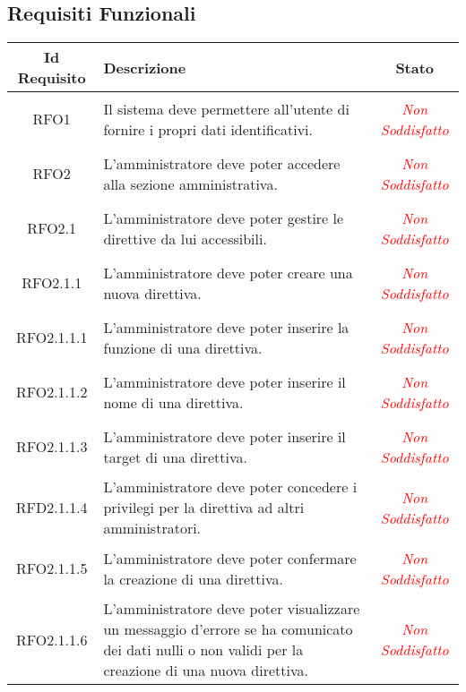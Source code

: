 \subsection{Requisiti Funzionali}
\normalsize
\begin{longtable}{|c|>{\centering}m{7cm}|c|}
\hline 
\textbf{Id Requisito} & \textbf{Descrizione} & \textbf{Stato}\\
\hline
\endhead
\hypertarget{RFO1}{RFO1} & Il sistema deve permettere all'utente di fornire i propri dati identificativi. & \textcolor{red}{\textit{Non Soddisfatto}}\\ \hline

\hypertarget{RFO2}{RFO2} & L'amministratore deve poter accedere alla sezione amministrativa. & \textcolor{red}{\textit{Non Soddisfatto}}\\ \hline

\hypertarget{RFO2.1}{RFO2.1} & L'amministratore deve poter gestire le direttive da lui accessibili. & \textcolor{red}{\textit{Non Soddisfatto}}\\ \hline

\hypertarget{RFO2.1.1}{RFO2.1.1} & L'amministratore deve poter creare una nuova direttiva. & \textcolor{red}{\textit{Non Soddisfatto}}\\ \hline

\hypertarget{RFO2.1.1.1}{RFO2.1.1.1} & L'amministratore deve poter inserire la funzione di una direttiva. & \textcolor{red}{\textit{Non Soddisfatto}}\\ \hline

\hypertarget{RFO2.1.1.2}{RFO2.1.1.2} & L'amministratore deve poter inserire il nome di una direttiva. & \textcolor{red}{\textit{Non Soddisfatto}}\\ \hline

\hypertarget{RFO2.1.1.3}{RFO2.1.1.3} & L'amministratore deve poter inserire il target di una direttiva. & \textcolor{red}{\textit{Non Soddisfatto}}\\ \hline

\hypertarget{RFD2.1.1.4}{RFD2.1.1.4} & L'amministratore deve poter concedere i privilegi per la direttiva ad altri amministratori. & \textcolor{red}{\textit{Non Soddisfatto}}\\ \hline

\hypertarget{RFO2.1.1.5}{RFO2.1.1.5} & L'amministratore deve poter confermare la creazione di una direttiva. & \textcolor{red}{\textit{Non Soddisfatto}}\\ \hline

\hypertarget{RFO2.1.1.6}{RFO2.1.1.6} & L'amministratore deve poter visualizzare un messaggio d'errore se ha comunicato dei dati nulli o non validi per la creazione di una nuova direttiva. & \textcolor{red}{\textit{Non Soddisfatto}}\\ \hline


\end{longtable}
